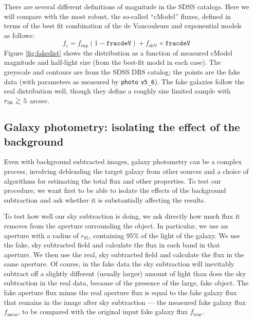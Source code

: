 \documentclass[10pt,preprint]{aastex}
\def\simgreat{\mathbin{\lower 3pt\hbox
    {$\,\rlap{\raise 5pt\hbox{$\char'076$}}\mathchar"7218\,$}}} %
\begin{document}
There are several different definitions of magnitude in the SDSS
catalogs. Here we will compare with the most robust, the so-called
``cModel'' fluxes, defined in terms of the best fit combination of the
de Vaucouleurs and exponential models as follows:
\begin{equation}
 f_c = f_{\mathrm{exp}} \left(1-\mathtt{fracdeV}\right) +
 f_{\mathrm{deV}}
 \times \mathtt{fracdeV}
\end{equation}
Figure \ref{fig:fakedist} shows the distribution as a function of
measured cModel magnitude and half-light size (from the best-fit model
in each case). The greyscale and contours are from the SDSS DR8
catalog; the points are the fake data (with parameters as measured by
{\tt photo} {\tt v5\_6}). The fake galaxies follow the real
distribution well, though they define a roughly size limited sample
with $r_{50} \simgreat 5$ arcsec.

\subsection{Galaxy photometry: isolating the effect of the background}
\label{sec:simplegal}

Even with background subtracted images, galaxy photometry can be a
complex process, involving deblending the target galaxy from other
sources and a choice of algorithms for estimating the total flux and
other properties.  To test our procedure, we want first to be able to
isolate the effects of the background subtraction and ask whether it
is substantially affecting the results.

To test how well our sky subtraction is doing, we ask directly how
much flux it removes from the aperture surrounding the object. In
particular, we use an aperture with a radius of $r_{95}$, containing
95\% of the light of the galaxy.  We use the fake, sky subtracted
field and calculate the flux in each band in that aperture.  We then
use the real, sky subtracted field and calculate the flux in the same
aperture.  Of course, in the fake data the sky subtraction will
inevitably subtract off a slightly different (usually larger) amount
of light than does the sky subtraction in the real data, because of
the presence of the large, fake object. The fake aperture flux minus
the real aperture flux is equal to the fake galaxy flux that remains
in the image after sky subtraction --- the measured fake galaxy flux
$f_{\mathrm{meas}}$, to be compared with the original input fake
galaxy flux $f_{\mathrm{true}}$.
\end{document}
